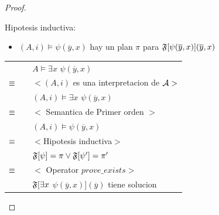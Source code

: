 \begin{proof}
\begin{itemize}
\begin{itemize}
					  Hipotesis inductiva:
					 	\begin{itemize}
					 		\item $(A,i) \models \psi(\overline{y},x)$ hay un plan $\pi$ para $\mathfrak{F}[\psi(\overline{y},x)] (\overline{y},x)$
					 	\end{itemize}
				
					\begin{tabular}{@{}p{1mm}p{1mm}p{11cm}}	
					 	& & $A \models \exists x$ $ \psi(\overline{y},x)$\\
						$\equiv$ & & $<(A,i)$ es una interpretacion de $\mathcal{A}>$ \\
						& & $(A,i) \models \exists x$ $ \psi(\overline{y},x)$ \\
						$\equiv$ & & $<$ Semantica de Primer orden $>$\\
						& & $(A,i) \models \psi(\overline{y},x)$ \\
						$\equiv$ & & $<$Hipotesis inductiva$>$\\
						& & $\mathfrak{F}[\psi] = \pi \lor \mathfrak{F}[\psi'] = \pi'$\\
						$\equiv$ & & $<$ Operator $ prove\_exists >$\\
						& & $\mathfrak{F}[\exists x$ $ \psi(\overline{y},x)](\overline{y})$ tiene solucion
					\end{tabular}

			\end{itemize}
		
	\end{itemize}
\end{proof}
